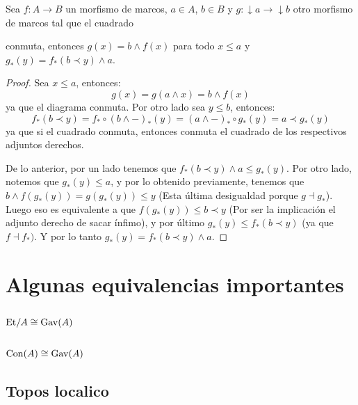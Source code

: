 \begin{lema}
    Sea $f:A\to B$ un morfismo de marcos, $a\in A$, $b\in B$ y $g:\downarrow a\to \downarrow b$ otro morfismo de marcos tal que 
    el cuadrado  conmuta, entonces $g(x)=b\wedge f(x)$ para todo $x\leq a$ y $g_*(y)=f_*(b\prec y)\wedge a$.
\end{lema}
\begin{proof}
    Sea $x\leq a$, entonces:
    $$g(x)=g(a\wedge x)=b\wedge f(x)$$
    ya que el diagrama conmuta. Por otro lado sea $y\leq b$, entonces:
    $$f_*(b\prec y)=f_*\circ (b\wedge-)_*(y)=(a\wedge-)_*\circ g_*(y)=a\prec g_*(y)$$
    ya que si el cuadrado conmuta, entonces conmuta el cuadrado de los respectivos adjuntos derechos.
    
    De lo anterior, por un lado tenemos que $f_*(b\prec y)\wedge a\leq g_*(y)$. Por otro lado, notemos que $g_*(y)\leq a$,
    y por lo obtenido previamente, tenemos que $b\wedge f(g_*(y))=g(g_*(y))\leq y$ (Esta última desigualdad porque $g\dashv g_*$).
    Luego eso es equivalente a que $f(g_*(y))\leq b\prec y$ (Por ser la implicación el adjunto derecho de sacar ínfimo), y por último
    $g_*(y)\leq f_*(b\prec y)$ (ya que $f\dashv f_*)$. Y por lo tanto $g_*(y)=f_*(b\prec y)\wedge a$.
\end{proof}

\section{Algunas equivalencias importantes}

\subsection{${\mathrm{Et}}/A\cong{\mathrm{Gav}}(A)$}

\subsection{${\mathrm{Con}}(A)\cong {\mathrm{Gav}}(A)$}

\subsection{Topos localico}
